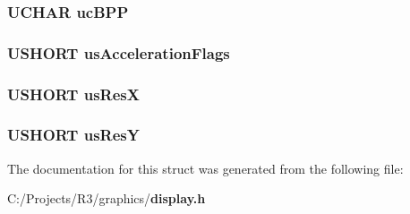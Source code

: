 \subsubsection[{ucBPP}]{\setlength{\rightskip}{0pt plus 5cm}UCHAR {\bf ucBPP}}\label{struct_d_i_s_p_l_a_y___d_r_i_v_e_r___s_t_r_u_c_t_a6f52d746dc0bd97e281dc7e0c1d47d0c}
\subsubsection[{usAccelerationFlags}]{\setlength{\rightskip}{0pt plus 5cm}USHORT {\bf usAccelerationFlags}}\label{struct_d_i_s_p_l_a_y___d_r_i_v_e_r___s_t_r_u_c_t_a099ffd54c41a12a8f746e11e8c1e2a0b}
\subsubsection[{usResX}]{\setlength{\rightskip}{0pt plus 5cm}USHORT {\bf usResX}}\label{struct_d_i_s_p_l_a_y___d_r_i_v_e_r___s_t_r_u_c_t_a29764474fb4c1e4c745cda38ebeeceff}
\subsubsection[{usResY}]{\setlength{\rightskip}{0pt plus 5cm}USHORT {\bf usResY}}\label{struct_d_i_s_p_l_a_y___d_r_i_v_e_r___s_t_r_u_c_t_a7d1a07acce802d8d3a7638e5f460de42}


The documentation for this struct was generated from the following file:\begin{DoxyCompactItemize}
\item 
C:/Projects/R3/graphics/{\bf display.h}\end{DoxyCompactItemize}
